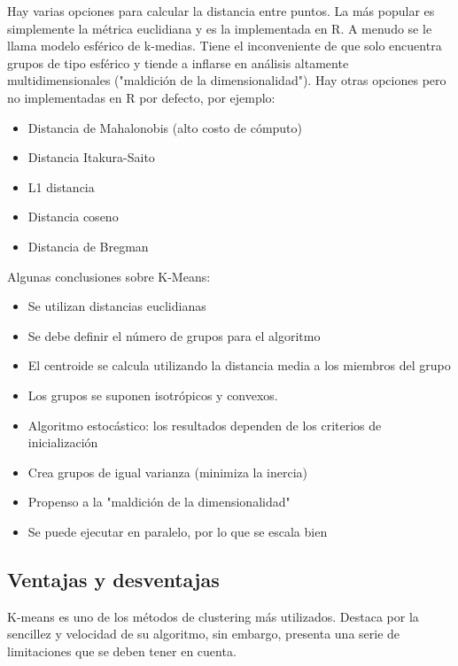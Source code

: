 \documentclass[12pt, fleqn]{report}                             %
\theoremstyle{break}                                            %
\begin{document}
\begin{itemize}
                Hay varias opciones para calcular la distancia entre puntos.
                La más popular es simplemente la métrica euclidiana y es la implementada en R. 
                A menudo se le llama modelo esférico de k-medias. Tiene el inconveniente de que solo encuentra grupos
                de tipo esférico y tiende a inflarse en análisis altamente multidimensionales ("maldición de la dimensionalidad"). 
                Hay otras opciones pero no implementadas en R por defecto, por ejemplo:
                \begin{itemize}
                    \item Distancia de Mahalonobis (alto costo de cómputo)
                    \item Distancia Itakura-Saito
                    \item L1 distancia
                    \item Distancia coseno
                    \item Distancia de Bregman
                \end{itemize}
        \end{itemize}

        Algunas conclusiones sobre K-Means:
        \begin{itemize}
            \item Se utilizan distancias euclidianas
            \item Se debe definir el número de grupos para el algoritmo
            \item El centroide se calcula utilizando la distancia media a los miembros del grupo
            \item Los grupos se suponen isotrópicos y convexos.
            \item Algoritmo estocástico: los resultados dependen de los criterios de inicialización
            \item Crea grupos de igual varianza (minimiza la inercia)
            \item Propenso a la "maldición de la dimensionalidad"
            \item Se puede ejecutar en paralelo, por lo que se escala bien
        \end{itemize}

        \subsection{Ventajas y desventajas}

            K-means es uno de los métodos de clustering más utilizados. 
            Destaca por la sencillez y velocidad de su algoritmo, sin embargo, presenta una serie de
                limitaciones que se deben tener en cuenta.
\end{document}
